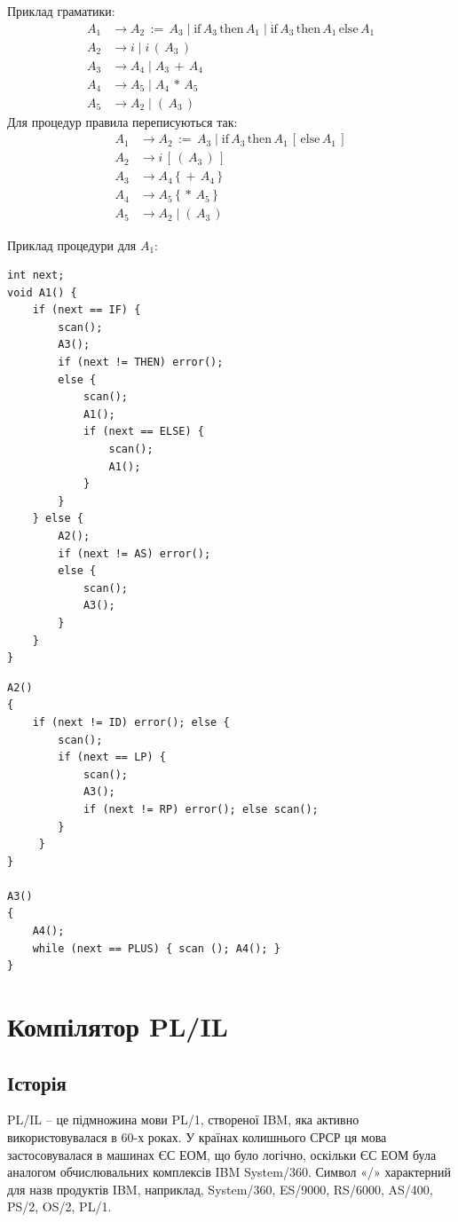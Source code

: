 \documentclass{memoir}
\begin{document}
Приклад граматики:
\begin{align*}
A_1 &\to A_2 \, := \, A_3 \mid \text{if} \, A_3 \, \text{then} \, A_1 \mid \text{if} \, A_3 \, \text{then} \, A_1 \, \text{else} \, A_1 \\
A_2 &\to i \mid i \, ( \, A_3 \, ) \\
A_3 &\to A_4 \mid A_3 \, + \, A_4 \\
A_4 &\to A_5 \mid A_4 \, * \, A_5 \\
A_5 &\to A_2 \mid ( \, A_3 \, )
\end{align*}
Для процедур правила переписуються так:
\begin{align*}
A_1 &\to A_2 \, := \, A_3 \mid \text{if} \, A_3 \, \text{then} \, A_1 \, [ \, \text{else} \, A_1 \, ] \\
A_2 &\to i \, [ \, ( \, A_3 \, ) \, ] \\
A_3 &\to A_4 \, \{ \, + \, A_4 \, \} \\
A_4 &\to A_5 \, \{ \, * \, A_5 \, \} \\
A_5 &\to A_2 \mid ( \, A_3 \, )
\end{align*}

Приклад процедури для \( A_1 \):
\begin{lstlisting}
int next;
void A1() {
    if (next == IF) {
        scan();
        A3();
        if (next != THEN) error();
        else {
            scan();
            A1();
            if (next == ELSE) {
                scan();
                A1();
            }
        }
    } else {
        A2();
        if (next != AS) error();
        else {
            scan();
            A3();
        }
    }
}
\end{lstlisting}

\newpage
\begin{lstlisting}
A2()
{
    if (next != ID) error(); else {
        scan();
        if (next == LP) {
            scan();
            A3();
            if (next != RP) error(); else scan();
        }
     }
}

A3()
{
    A4();
    while (next == PLUS) { scan (); A4(); }
}
\end{lstlisting}

\chapter{Компілятор PL/IL}
\section{Історія}
PL/IL – це підмножина мови PL/1, створеної IBM, яка активно використовувалася в 60-х роках. У країнах колишнього СРСР ця мова застосовувалася в машинах ЄС ЕОМ, що було логічно, оскільки ЄС ЕОМ була аналогом обчислювальних комплексів IBM System/360. Символ «/» характерний для назв продуктів IBM, наприклад, System/360, ES/9000, RS/6000, AS/400, PS/2, OS/2, PL/1.
\end{document}
